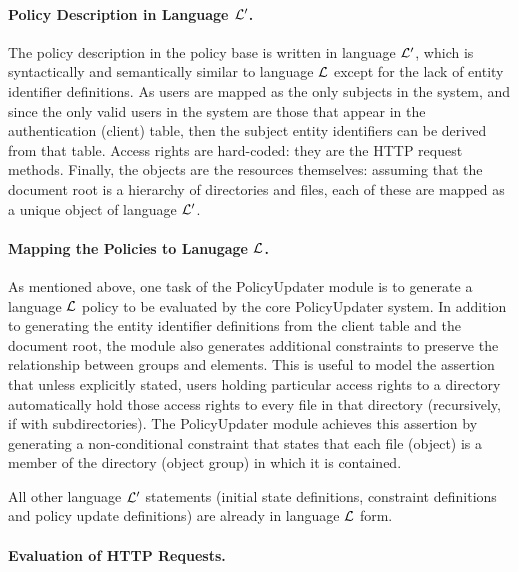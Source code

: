 \documentclass[11pt]{llncs}
\begin{document}
      \paragraph{\bf Policy Description in Language ${\cal L'}$.}

        The policy description in the policy base is written in language
        ${\cal L'}$, which is syntactically and semantically similar to
        language ${\cal L}$ except for the lack of entity identifier
        definitions. As users are mapped as the only subjects in the system,
        and since the only valid users in the system are those that appear in
        the authentication (client) table, then the subject entity identifiers
        can be derived from that table. Access rights are hard-coded: they are
        the HTTP request methods. Finally, the objects are the resources
        themselves: assuming that the document root is a hierarchy of
        directories and files, each of these are mapped as a unique object of
        language ${\cal L'}$.

      \paragraph{\bf Mapping the Policies to Lanugage ${\cal L}$.}

        As mentioned above, one task of the PolicyUpdater module is to generate
        a language ${\cal L}$ policy to be evaluated by the core PolicyUpdater
        system. In addition to generating the entity identifier definitions
        from the client table and the document root, the module also generates
        additional constraints to preserve the relationship between groups
        and elements. This is useful to model the assertion that unless
        explicitly stated, users holding particular access rights to a
        directory automatically hold those access rights to every file in
        that directory (recursively, if with subdirectories). The PolicyUpdater
        module achieves this assertion by generating a non-conditional
        constraint that states that each file (object) is a member of the
        directory (object group) in which it is contained.

        All other language ${\cal L'}$ statements (initial state definitions,
        constraint definitions and policy update definitions) are already in
        language ${\cal L}$ form.

      \paragraph{\bf Evaluation of HTTP Requests.}
\end{document}
